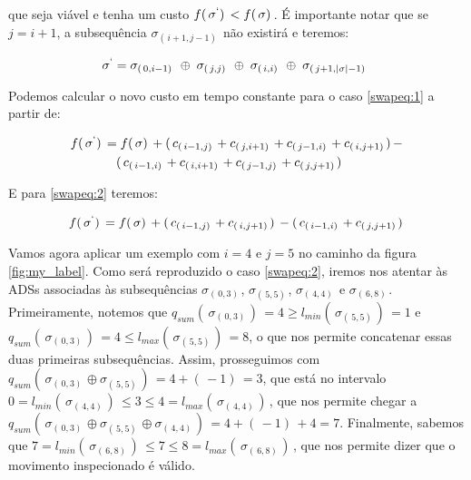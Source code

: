 que seja viável e tenha um custo $f(\,\sigma^\lq)\, < f(\,\sigma)\,$. É importante notar que se $j = i + 1$, a subsequência $\sigma_{(\,i+1, j-1)\,}$ não existirá e teremos:

    \begin{gather} \label{swapeq:2}
        \sigma^\lq = \sigma_{(\,0, i - 1)\,}\; \oplus\; \sigma_{(\,j, j)\,}\;  \oplus\; \sigma_{(\,i, i)\,}\;
        \oplus\; \sigma_{(\,j+1, |\sigma| - 1)\,}\;
    \end{gather}

Podemos calcular o novo custo em tempo constante para o caso \ref{swapeq:1} a partir de:

    \begin{gather} 
    \begin{split}
        f(\,\sigma^\lq)\,& = f(\,\sigma)\, + (\,c_{(\,i-1, j)\,} + c_{(\,j, i+1)\,} + c_{(\,j-1, i)\,} + c_{(\,i, j+1)\,})\, -\\
                         & \quad (\,c_{(\,i-1, i)\,} +       c_{(\,i, i+1)\,} + c_{(\,j-1, j)\,} + c_{(\,j, j+1)\,})\,
    \end{split}
    \end{gather}
    
E para \ref{swapeq:2} teremos:

    \begin{gather}
        f(\,\sigma^\lq)\, = f(\,\sigma)\, + (\,c_{(\,i-1, j)\,}  + c_{(\,i, j+1)\,})\, - (\,c_{(\,i-1, i)\,} + c_{(\,j, j+1)\,})\,
    \end{gather}

Vamos agora aplicar um exemplo com $i=4$ e $j=5$ no caminho da figura \ref{fig:my_label}. Como será reproduzido o caso \ref{swapeq:2}, iremos nos atentar às ADSs associadas às subsequências $\sigma_{(\,0, 3)\,}$, $\sigma_{(\,5, 5)\,}$, $\sigma_{(\,4, 4)\,}$ e $\sigma_{(\,6, 8)\,}$. Primeiramente, notemos que $q_{sum}(\,\sigma_{(\,0, 3)\,})\, = 4 \geq l_{min}(\,\sigma_{(\,5, 5)\,})\, = 1$ e $q_{sum}(\,\sigma_{(\,0, 3)\,})\, = 4 \leq l_{max}(\,\sigma_{(\,5, 5)\,})\, = 8$, o que nos permite concatenar essas duas primeiras subsequências. Assim, prosseguimos com $q_{sum}(\,\sigma_{(\,0, 3)\,} \oplus \sigma_{(\,5, 5)\,})\, = 4 + (\,-1)\, = 3$, que está no intervalo $0 = l_{min}(\,\sigma_{(\,4, 4)\,})\, \leq 3 \leq 4 = l_{max}(\,\sigma_{(\,4, 4)\,})\,$, que nos permite chegar a $q_{sum}(\,\sigma_{(\,0, 3)\,} \oplus \sigma_{(\,5, 5)\,} \oplus \sigma_{(\,4, 4)\,})\, = 4 + (\,-1)\, + 4 = 7$. Finalmente, sabemos que $7 = l_{min}(\,\sigma_{(\,6, 8)\,})\, \leq 7 \leq 8 = l_{max}(\,\sigma_{(\,6, 8)\,})\,$, que nos permite dizer que o movimento inspecionado é válido.


